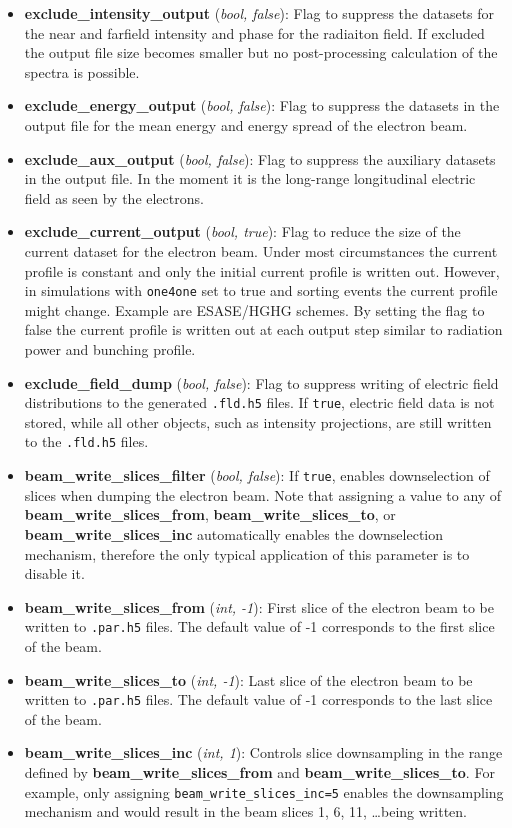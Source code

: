 \documentclass[12pt]{book}
\begin{document}
\begin{itemize}
\item {\bf exclude\_intensity\_output} ({\it bool, false}): Flag to suppress the datasets for the near and farfield intensity and phase for the radiaiton field. If excluded the output file size becomes smaller but no post-processing calculation of the spectra is possible.

\item {\bf exclude\_energy\_output} ({\it bool, false}): Flag to suppress the datasets in the output file for the mean energy and energy spread of the electron beam.

\item {\bf exclude\_aux\_output} ({\it bool, false}): Flag to suppress the auxiliary datasets in the output file. In the moment it is the long-range longitudinal electric field as seen by the electrons.


\item {\bf exclude\_current\_output} ({\it bool, true}): Flag to reduce the size of the current dataset for the electron beam. Under most circumstances the current profile is constant and only the initial current profile is written out. However, in simulations with {\tt one4one} set to true and sorting events the current profile might change. Example are ESASE/HGHG schemes. By setting the flag to false the current profile is written out at each output step similar to radiation power and bunching profile.

\item {\bf exclude\_field\_dump} ({\it bool, false}): Flag to suppress writing of electric field distributions to the generated {\tt .fld.h5} files. If {\tt true}, electric field data is not stored, while all other objects, such as intensity projections, are still written to the {\tt .fld.h5} files.

\item {\bf beam\_write\_slices\_filter} ({\it bool, false}): If {\tt true}, enables downselection of slices when dumping the electron beam. Note that assigning a value to any of {\bf beam\_write\_slices\_from}, {\bf beam\_write\_slices\_to}, or {\bf beam\_write\_slices\_inc} automatically enables the downselection mechanism, therefore the only typical application of this parameter is to disable it.
\item {\bf beam\_write\_slices\_from} ({\it int, -1}): First slice of the electron beam to be written to {\tt .par.h5} files. The default value of -1 corresponds to the first slice of the beam.
\item {\bf beam\_write\_slices\_to} ({\it int, -1}): Last slice of the electron beam to be written to {\tt .par.h5} files. The default value of -1 corresponds to the last slice of the beam.
\item {\bf beam\_write\_slices\_inc} ({\it int, 1}): Controls slice downsampling in the range defined by {\bf beam\_write\_slices\_from} and {\bf beam\_write\_slices\_to}. For example, only assigning {\tt beam\_write\_slices\_inc=5} enables the downsampling mechanism and would result in the beam slices 1, 6, 11, \ldots being written.




\end{itemize}
\end{document}

